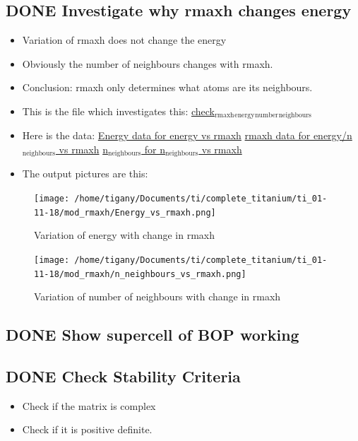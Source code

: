 \documentclass[11pt]{article}
\begin{document}
\subsection{{\bfseries\sffamily DONE} Investigate why rmaxh changes energy}
\label{sec:org733a3ca}
\begin{itemize}
\item Variation of rmaxh does not change the energy
\item Obviously the number of neighbours changes with rmaxh.
\item Conclusion: rmaxh only determines what atoms are its neighbours.
\item This is the file which investigates this:
\href{file:///home/tigany/Documents/ti/complete\_titanium/ti\_01-11-18/mod\_rmaxh/check\_rmaxh\_energy\_neighbours.py}{check\(_{\text{rmaxh}}\)\(_{\text{energy}}\)\(_{\text{number}}\)\(_{\text{neighbours}}\)}
\item Here is the data:
\href{file:///home/tigany/Documents/ti/complete\_titanium/ti\_01-11-18/mod\_rmaxh/energy\_for\_energy\_vs\_rmaxh.pkl}{Energy data for energy vs rmaxh}
\href{file:///home/tigany/Documents/ti/complete\_titanium/ti\_01-11-18/mod\_rmaxh/rmaxh\_for\_energy\_or\_n\_neighbours\_vs\_rmaxh.pkl}{rmaxh data for energy/n\(_{\text{neighbours}}\) vs rmaxh}
\href{file:///home/tigany/Documents/ti/complete\_titanium/ti\_01-11-18/mod\_rmaxh/n\_neighbours\_for\_n\_neighbours\_vs\_rmaxh.pkl}{n\(_{\text{neighbours}}\) for n\(_{\text{neighbours}}\) vs rmaxh}
\item The output pictures are this:
\end{itemize}
\begin{figure}[htbp]
\centering
\texttt{[image: /home/tigany/Documents/ti/complete\_titanium/ti\_01-11-18/mod\_rmaxh/Energy\_vs\_rmaxh.png]}
\caption{\label{fig:org459313d}
Variation of energy with change in rmaxh}
\end{figure}
\begin{figure}[htbp]
\centering
\texttt{[image: /home/tigany/Documents/ti/complete\_titanium/ti\_01-11-18/mod\_rmaxh/n\_neighbours\_vs\_rmaxh.png]}
\caption{\label{fig:org75fd31e}
Variation of number of neighbours with change in rmaxh}
\end{figure}

\subsection{{\bfseries\sffamily DONE} Show supercell of BOP working}
\label{sec:orgbb16d41}
\subsection{{\bfseries\sffamily DONE} Check Stability Criteria}
\label{sec:orgfbbf92a}
\begin{itemize}
\item Check if the matrix is complex
\item Check if it is positive definite.
\end{itemize}
\end{document}
